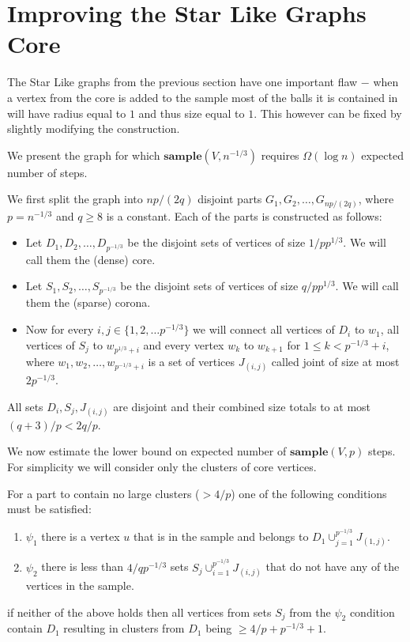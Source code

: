 \documentclass[shortabstract, lic, english]{iithesis}
\theoremstyle{definition} \newtheorem{definition}{Definition}[chapter]
\theoremstyle{plain} \newtheorem{remark}[definition]{Observation}
\theoremstyle{plain} \newtheorem{theorem}[definition]{Theorem}
\theoremstyle{plain} \newtheorem{lemma}[definition]{Lemma}
\theoremstyle{plain} \newtheorem{conjecture}[definition]{Conjecture}
\begin{document}
\section{Improving the Star Like Graphs Core}

The Star Like graphs from the previous section have one important flaw $-$
when a vertex from the core is added to the sample most of the balls it is contained in will have radius equal to $1$ and thus size equal to $1$.
This however can be fixed by slightly modifying the construction.

We present the graph for which $\mathbf{sample}(V, n^{-1/3})$ requires $\Omega(\log n)$ expected number of steps.

We first split the graph into $np/(2q)$ disjoint parts $G_1, G_2, \ldots, G_{np/(2q)}$, where $p = n^{-1/3}$ and $q \geq 8$ is a constant.
Each of the parts is constructed as follows:
\begin{itemize}
    \item Let $D_1, D_2, \ldots, D_{p^{-1/3}}$ be the disjoint sets of vertices of size $1/p  p^{1/3}$. We will call them the (dense) core.
    \item Let $S_1, S_2, \ldots, S_{p^{-1/3}}$ be the disjoint sets of vertices of size $q/p  p^{1/3}$. We will call them the (sparse) corona.
    \item Now for every $i, j \in \{1, 2, \ldots p^{-1/3}\}$ we will connect all vertices of $D_i$ to $w_1$, all vertices of $S_j$ to $w_{p^{1/3} + i}$ and every vertex $w_k$ to $w_{k+1}$ for $1 \leq k < p^{-1/3} + i$,
            where $w_1, w_2, \ldots, w_{p^{-1/3} + i}$ is a set of vertices $J_{(i, j)}$ called joint of size at most $2  p^{-1/3}$.
\end{itemize}
All sets $D_i, S_j, J_{(i, j)}$ are disjoint and their combined size totals to at most $(q + 3)/p < 2q/p$.

We now estimate the lower bound on expected number of $\mathbf{sample}(V, p)$ steps.
For simplicity we will consider only the clusters of core vertices.

For a part to contain no large clusters ($> 4/p$) one of the following conditions must be satisfied:
\begin{enumerate}
    \item $\psi_1$ there is a vertex $u$ that is in the sample and belongs to $D_1 \cup_{j=1}^{p^{-1/3}} J_{(1, j)}$.
    \item $\psi_2$ there is less than $4/q  p^{-1/3}$ sets $S_j \cup_{i=1}^{p^{-1/3}} J_{(i, j)}$ that do not have any of the vertices in the sample.
\end{enumerate}
if neither of the above holds then all vertices from sets $S_j$ from the $\psi_2$ condition contain $D_1$ resulting in clusters from $D_1$ being $\geq 4/p + p^{-1/3} + 1$.
\end{document}
